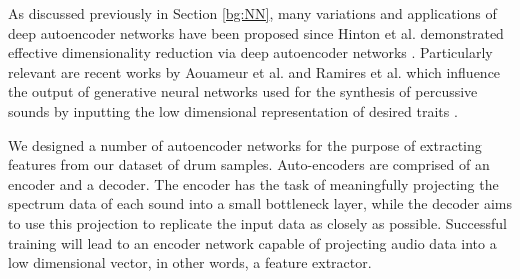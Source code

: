 \documentclass[\main/thesis.tex]{subfiles}
\begin{document}
As discussed previously in Section \ref{bg:NN}, many variations and applications of deep autoencoder networks have been proposed since Hinton et al. demonstrated effective dimensionality reduction via deep autoencoder networks \cite{hinton1994autoencoders,hinton2006reducing}. Particularly relevant are recent works by Aouameur et al. and Ramires et al. which influence the output of generative neural networks used for the synthesis of percussive sounds by inputting the low dimensional representation of desired traits \cite{aouameur2019neural,ramires2020neural}. 

We designed a number of autoencoder networks for the purpose of extracting features from our dataset of drum samples. Auto-encoders are comprised of an encoder and a decoder. The encoder has the task of meaningfully projecting the spectrum data of each sound into a small bottleneck layer, while the decoder aims to use this projection to replicate the input data as closely as possible. Successful training will lead to an encoder network capable of projecting audio data into a low dimensional vector, in other words, a feature extractor. 
\end{document}

